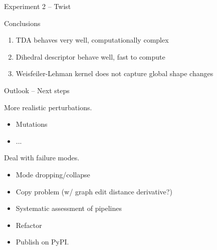 \documentclass[aspectratio=169, 10pt, dvipsnames]{beamer}
\begin{document}
{\begin{frame}[fragile]{Experiment 2 -- Twist}
\begin{minipage}{0.38\linewidth}
  \begin{alert}{Conclusions}
    \begin{enumerate}
      \pause\item TDA behaves very well, computationally complex
      \pause\item Dihedral descriptor behave well, fast to compute
      \pause\item Weisfeiler-Lehman kernel does not capture global shape changes
    \end{enumerate}
  \end{alert}
  \end{minipage}
\end{frame}
}

\begin{frame}[fragile]{Outlook -- Next steps}
  \begin{minipage}{0.48\textwidth}
    More realistic perturbations.
    \begin{itemize}
    \pause \item Mutations
    \pause \item ...
    \end{itemize}

    \pause Deal with failure modes.
    \begin{itemize}
      \pause \item Mode dropping/collapse
      \pause \item Copy problem (w/ graph edit distance derivative?)
    \end{itemize}

  \end{minipage}
  \hfill
  \begin{minipage}{0.48\textwidth}
    \begin{itemize}
      \item Systematic assessment of pipelines
      \item Refactor
      \item Publish on PyPI.
    \end{itemize}
  \end{minipage}
\end{frame}
\end{document}
